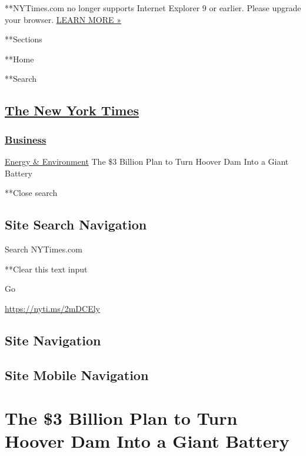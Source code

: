  **NYTimes.com no longer supports Internet Explorer 9 or earlier. Please
upgrade your browser.
\href{http://www.nytimes3xbfgragh.onion/content/help/site/ie9-support.html}{LEARN
MORE »}

**Sections

**Home

**Search

\hypertarget{the-new-york-times}{%
\subsection{\texorpdfstring{\href{http://www.nytimes3xbfgragh.onion/}{The
New York Times}}{The New York Times}}\label{the-new-york-times}}

\hypertarget{-business-}{%
\subsubsection{\texorpdfstring{ \href{/section/business}{Business}
}{ Business }}\label{-business-}}

 \href{/section/business/energy-environment}{Energy \& Environment}
\textbar{}The \$3 Billion Plan to Turn Hoover Dam Into a Giant Battery

**Close search

\hypertarget{site-search-navigation}{%
\subsection{Site Search Navigation}\label{site-search-navigation}}

Search NYTimes.com

**Clear this text input

Go

\url{https://nyti.ms/2mDCEly}

\hypertarget{site-navigation}{%
\subsection{Site Navigation}\label{site-navigation}}

\hypertarget{site-mobile-navigation}{%
\subsection{Site Mobile Navigation}\label{site-mobile-navigation}}

\hypertarget{the-3-billion-plan-to-turn-hoover-dam-into-a-giant-battery}{%
\section{The \$3 Billion Plan to Turn Hoover Dam Into a Giant
Battery}\label{the-3-billion-plan-to-turn-hoover-dam-into-a-giant-battery}}


